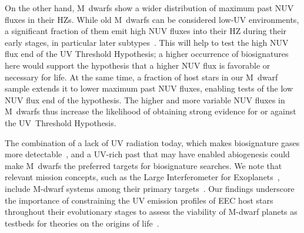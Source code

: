 \documentclass[twocolumn,twocolappendix,linenumbers]{aastex631}
\begin{document}
On the other hand, M~dwarfs show a wider distribution of maximum past \gls{NUV} fluxes in their \glspl{HZ}.
While old M~dwarfs can be considered low-UV environments, a significant fraction of them emit high \gls{NUV} fluxes into their \gls{HZ} during their early stages, in particular later subtypes~\citep{Richey-Yowell2023}.
This will help to test the high \gls{NUV} flux end of the UV Threshold Hypothesis; a higher occurrence of biosignatures here would support the hypothesis that a higher NUV flux is favorable or necessary for life.
At the same time, a fraction of host stars in our M~dwarf sample extends it to lower maximum past \gls{NUV} fluxes, enabling tests of the low \gls{NUV} flux end of the hypothesis.
The higher and more variable \gls{NUV} fluxes in M~dwarfs thus increase the likelihood of obtaining strong evidence for or against the UV~Threshold Hypothesis.

The combination of a lack of UV radiation today, which makes biosignature gases more detectable~\citep{Segura2005}, and a UV-rich past that may have enabled abiogenesis could make M~dwarfs the preferred targets for biosignature searches.
We note that relevant mission concepts, such as the Large Interferometer for Exoplanets~\citep[\life,][]{Quanz2022,Glauser2024}, include M-dwarf systems among their primary targets~\citep{Kammerer2018,Carrion-Gonzalez2023}.
Our findings underscore the importance of constraining the UV emission profiles of \gls{EEC} host stars throughout their evolutionary stages to assess the viability of M-dwarf planets as testbeds for theories on the origins of life~\citep{Rimmer2021,Ranjan2023a}.
\end{document}
